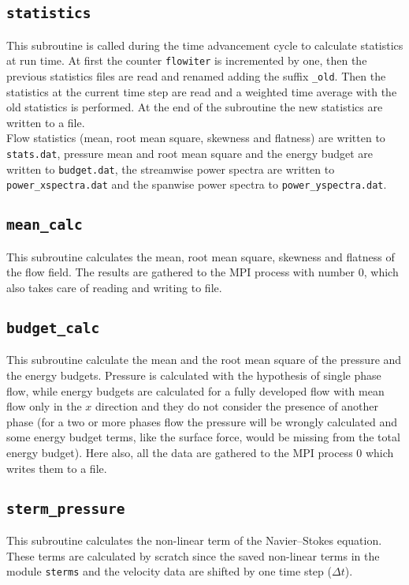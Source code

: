 \subsection{\texttt{statistics}}
This subroutine is called during the time advancement cycle to calculate statistics at run time. At first the counter \texttt{flowiter} is incremented by one, then the previous statistics files are read and renamed adding the suffix \texttt{\_old}. Then the statistics at the current time step are read and a weighted time average with the old statistics is performed. At the end of the subroutine the new statistics are written to a file.\\
Flow statistics (mean, root mean square, skewness and flatness) are written to \texttt{stats.dat}, pressure mean and root mean square and the energy budget are written to \texttt{budget.dat}, the streamwise power spectra are written to \texttt{power\_xspectra.dat} and the spanwise power spectra to \texttt{power\_yspectra.dat}.

\subsection{\texttt{mean\_calc}}
This subroutine calculates the mean, root mean square, skewness and flatness of the flow field. The results are gathered to the MPI process with number 0, which also takes care of reading and writing to file.

\subsection{\texttt{budget\_calc}}
This subroutine calculate the mean and the root mean square of the pressure and the energy budgets. Pressure is calculated with the hypothesis of single phase flow, while energy budgets are calculated for a fully developed flow with mean flow only in the $x$ direction and they do not consider the presence of another phase (for a two or more phases flow the pressure will be wrongly calculated and some energy budget terms, like the surface force, would be missing from the total energy budget). Here also, all the data are gathered to the MPI process 0 which writes them to a file.

\subsection{\texttt{sterm\_pressure}}
This subroutine calculates the non-linear term of the Navier--Stokes equation. These terms are calculated by scratch since the saved non-linear terms in the module \texttt{sterms} and the velocity data are shifted by one time step ($\Delta t$). 

